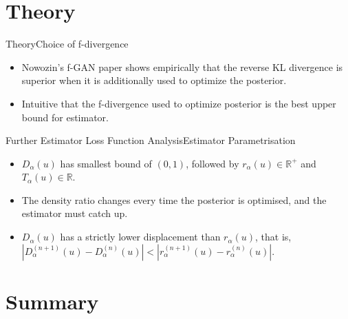 \documentclass{beamer}
\newcommand{\R}{\mathbb{R}}
\begin{document}

\section{Theory}
\begin{frame}{Theory}{Choice of f-divergence}
\begin{itemize}
\item Nowozin's f-GAN paper shows empirically that the reverse KL divergence is superior when it is additionally used to optimize the posterior.
\item Intuitive that the f-divergence used to optimize posterior is the best upper bound for estimator.
\end{itemize}
\end{frame}
\begin{frame}{Further Estimator Loss Function Analysis}{Estimator Parametrisation}
\begin{itemize}
\item $D_\alpha(u)$ has smallest bound of $(0,1)$, followed by $r_\alpha(u) \in \R^+$ and $T_\alpha(u)\in \R$.
\item The density ratio changes every time the posterior is optimised, and the estimator must catch up.
\item $D_\alpha(u)$ has a strictly lower displacement than $r_\alpha(u)$, that is, $|D_\alpha^{(n+1)}(u)-D_\alpha^{(n)}(u)|<|r_\alpha^{(n+1)}(u)-r_\alpha^{(n)}(u)|$.
\end{itemize}
\end{frame}


\section*{Summary}
\end{document}
